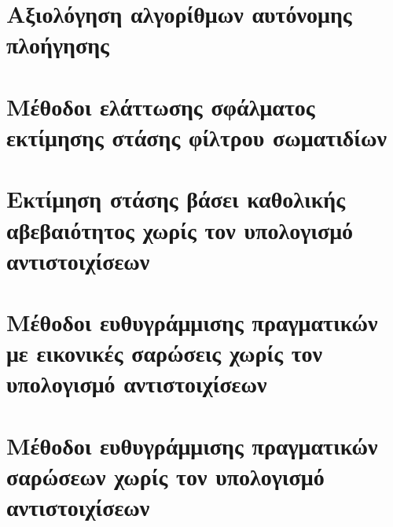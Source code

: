 \chapter{Αξιολόγηση αλγορίθμων αυτόνομης πλοήγησης}
  \label{part:02:chapter:01}
  

\chapter{Μέθοδοι ελάττωσης σφάλματος εκτίμησης στάσης φίλτρου σωματιδίων}
  \label{part:02:chapter:02}
  

\chapter{Εκτίμηση στάσης βάσει καθολικής αβεβαιότητος χωρίς τον υπολογισμό αντιστοιχίσεων}
  \label{part:02:chapter:03}
  

\chapter{Μέθοδοι ευθυγράμμισης πραγματικών με εικονικές σαρώσεις χωρίς τον υπολογισμό αντιστοιχίσεων}
  \label{part:02:chapter:04}
  

\chapter{Μέθοδοι ευθυγράμμισης πραγματικών σαρώσεων χωρίς τον υπολογισμό αντιστοιχίσεων}
  \label{part:02:chapter:05}
  
